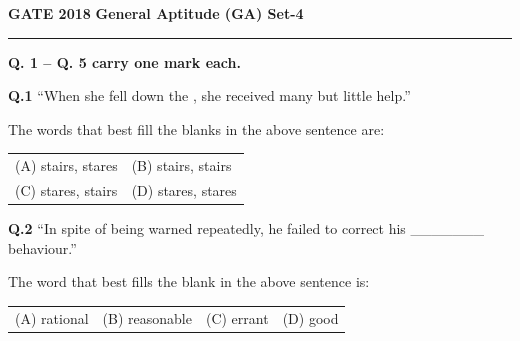 \documentclass{article}
\begin{document}
\textbf{GATE 2018} \hfill \textbf{General Aptitude (GA) Set-4}

\vspace{0.05cm}
\hrule
\vspace{0.2cm}

\textbf{Q. 1 -- Q. 5 carry one mark each.}

\vspace{0.4cm}

\textbf{Q.1} \hspace{0.2cm } ``When she fell down the \underline{\hspace{1.5cm}}, she received many \underline{\hspace{1.5cm}} but little help.''

\vspace{0.5cm}

\hspace{1.3cm}The words that best fill the blanks in the above sentence are:

\vspace{0.6cm}

\begin{tabular}{ll}
\hspace{1cm}(A) stairs, stares & \hspace{3cm}(B) stairs, stairs \\
 \hspace{1cm}(C) stares, stairs & \hspace{3cm}(D) stares, stares \\
\end{tabular}


\vspace{1cm}

\textbf{Q.2} \hspace{0.2cm} ``In spite of being warned repeatedly, he failed to correct his \_\_\_\_\_\_\_ behaviour.''

\vspace{0.3cm}

\hspace{1.2cm} The word that best fills the blank in the above sentence is:

\vspace{0.5cm}

\begin{tabular}{llll}
\hspace{1cm} (A) rational & \hspace{0.5cm} (B) reasonable & \hspace{0.5cm} (C) errant &  \hspace{0.5cm} (D) good \\
\end{tabular}
\end{document}
